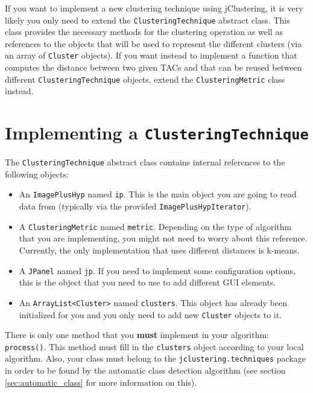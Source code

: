 \documentclass[11pt]{article} %
\begin{document}
If you want to implement a new clustering technique using jClustering, it is very likely you only need to extend the {\tt ClusteringTechnique} abstract class. This class provides the necessary methods for the clustering operation as well as references to the objects that will be used to represent the different clusters (via an array of {\tt Cluster} objects). If you want instead
to implement a function that computes the distance between two given TACs and that can be reused between different {\tt ClusteringTechnique} objects, extend the {\tt ClusteringMetric} class instead.

\section{Implementing a {\tt ClusteringTechnique}}
\label{sec:clustmet}

The {\tt ClusteringTechnique} abstract class contains internal references to the following objects:

\begin{itemize}
\item An {\tt ImagePlusHyp} named {\tt ip}. This is the main object you are going to read data from (typically via the provided {\tt ImagePlusHypIterator}).

\item A {\tt ClusteringMetric} named {\tt metric}. Depending on the type of algorithm that you are implementing, you might not need to worry about this reference. Currently, the only implementation that uses different distances is k-means.

\item A {\tt JPanel} named {\tt jp}. If you need to implement some configuration options, this is the object that you need to use to add different GUI elements.

\item An {\tt ArrayList<Cluster>} named {\tt clusters}. This object has already been initialized for you and you only need to add new {\tt Cluster} objects to it. 
\end{itemize}

There is only one method that you {\bf must} implement in your algorithm: {\tt process()}. This method must fill in the {\tt clusters} object according to your local algorithm. Also, your class must belong to the {\tt jclustering.techniques} package in order to be found by the automatic class detection algorithm (see section \ref{sec:automatic_class} for more information on this).
\end{document}
